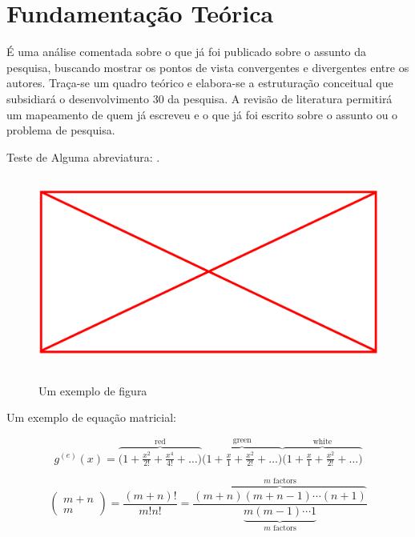 \chapter{Fundamentação Teórica} \label{cap:fund}
    
    É uma análise comentada sobre o que já foi publicado sobre o assunto da pesquisa, buscando mostrar os pontos de vista convergentes e divergentes entre os autores. Traça-se um quadro teórico e elabora-se a estruturação conceitual que subsidiará o desenvolvimento  30 da pesquisa. A revisão de literatura permitirá um mapeamento de quem já escreveu e o que já foi escrito sobre o assunto ou o problema de pesquisa.

	Teste de Alguma abreviatura: .
	
	\begin{figure}[H]
		\centering
		\caption{Um exemplo de figura}
		\includegraphics[width=\textwidth,height=240px,keepaspectratio]{pdf/noimage.png}
		\label{fig:esquematico_cbi}
	\end{figure}

	Um exemplo de equação matricial:
	
	\[
	g^{(e)}(x) = \overbrace{\bigl( 1 + \tfrac{x^2}{2!} + \tfrac{x^4}{4!} + \dots \bigr)}^{\text{red}}
	\overbrace{\bigl( 1 + \tfrac{x}{1} + \tfrac{x^2}{2!} + \dots \bigr)}^{\text{green}}
	\overbrace{\bigl( 1 + \tfrac{x}{1} + \tfrac{x^2}{2!} + \dots \bigr)}^{\text{white}}
	\]
	
	$$
	\left(
	\begin{array}{c}
		m+n\\
		m
	\end{array}
	\right)
	= \frac{(m+n)!}{m!n!}
	= \frac{\overbrace{(m+n)(m+n-1)\cdots(n+1)}^{\mbox{$m$ factors}}}{\underbrace{m(m-1)\cdots 1}_{\mbox{$m$ factors}}}
	$$

